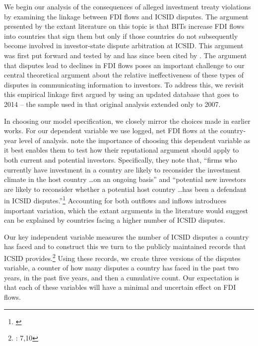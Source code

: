 \documentclass[12pt,onesided]{amsart}
\begin{document}
We begin our analysis of the consequences of alleged investment treaty violations by examining the linkage between FDI flows and ICSID disputes. The argument presented by the extant literature on this topic is that BITs increase FDI flows into countries that sign them but only if those countries do not subsequently become involved in investor-state dispute arbitration at ICSID. This argument was first put forward and tested by \citet{allee:peinhardt:2011} and has since been cited by \citet{berger2011more,poulsen2013claim,wellhausen2013,haftel2013delayed,kerner2014}. The argument that disputes lead to declines in FDI flows poses an important challenge to our central theoretical argument about the relative ineffectiveness of these types of disputes in communicating information to investors. To address this, we revisit this empirical linkage first argued by \citet{allee:peinhardt:2011} using an updated database that goes to 2014 -- the sample used in that original analysis extended only to 2007.

In choosing our model specification, we closely mirror the choices made in earlier works. For our dependent variable we use logged, net FDI flows at the country-year level of analysis. \citeauthor{allee:peinhardt:2011} note the importance of choosing this dependent variable as it best enables them to test how their reputational argument should apply to both current and potential investors. Specifically, they note that, ``firms who currently have investment in a country are likely to reconsider the investment climate in the host country \ldots on an ongoing basis'' and ``potential new investors are likely to reconsider whether a potential host country \ldots has been a defendant in ICSID disputes.''\footnote{\citet[p. 419--420]{allee:peinhardt:2011}} Accounting for both outflows and inflows introduces important variation, which the extant arguments in the literature would suggest can be explained by countries facing a higher number of ICSID disputes. 

Our key independent variable measures the number of ICSID disputes a country has faced and to construct this we turn to the publicly maintained records that ICSID provides.\footnote{\citet{icsid:2015}: 7,10} Using these records, we create three versions of the disputes variable, a counter of how many disputes a country has faced in the past two years, in the past five years, and then a cumulative count. Our expectation is that each of these variables will have a minimal and uncertain effect on FDI flows.
\end{document}
